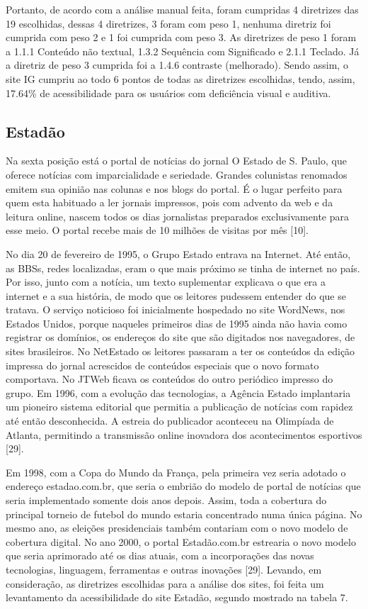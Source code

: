 \documentclass[a4paper]{article}
\begin{document}
\begin{titlepage}
Portanto, de acordo com a análise manual feita, foram cumpridas 4 diretrizes das 19 escolhidas, dessas 4 diretrizes, 3 foram com peso 1, nenhuma diretriz foi cumprida com peso 2 e 1 foi cumprida com peso 3. As diretrizes de peso 1 foram a 1.1.1 Conteúdo não textual, 1.3.2 Sequência com Significado e 2.1.1 Teclado. Já a diretriz de peso 3 cumprida foi a 1.4.6 contraste (melhorado). Sendo assim, o site IG cumpriu ao todo 6 pontos de todas as diretrizes escolhidas, tendo, assim, 17.64\% de acessibilidade para os usuários com deficiência visual e auditiva.

\subsection{Estadão}

Na sexta posição está o portal de notícias do jornal O Estado de S. Paulo, que oferece notícias com imparcialidade e seriedade. Grandes colunistas renomados emitem sua opinião nas colunas e nos blogs do portal. É o lugar perfeito para quem esta habituado a ler jornais impressos, pois com advento da web e da leitura online, nascem todos os dias jornalistas preparados exclusivamente para esse meio. O portal recebe mais de 10 milhões de visitas por mês [10].

No dia 20 de fevereiro de 1995, o Grupo Estado entrava na Internet. Até então, as BBSs, redes localizadas, eram o que mais próximo se tinha de internet no país. Por isso, junto com a notícia, um texto suplementar explicava o que era a internet e a sua história, de modo que os leitores pudessem entender do que se tratava. O serviço noticioso foi inicialmente hospedado no site WordNews, nos Estados Unidos, porque naqueles primeiros dias de 1995 ainda não havia como registrar os domínios, os endereços do site que são digitados nos navegadores, de sites brasileiros. No NetEstado os leitores passaram a ter os conteúdos da edição impressa do jornal acrescidos de conteúdos especiais que o novo formato comportava. No JTWeb ficava os conteúdos do outro periódico impresso do grupo. Em 1996, com a evolução das tecnologias, a Agência Estado implantaria um pioneiro sistema editorial que permitia a publicação de notícias com rapidez até então desconhecida. A estreia do publicador aconteceu na Olimpíada de Atlanta, permitindo a transmissão online inovadora dos acontecimentos esportivos [29].

Em 1998, com a Copa do Mundo da França, pela primeira vez seria adotado o endereço estadao.com.br, que seria o embrião do modelo de portal de notícias que seria implementado somente dois anos depois. Assim, toda a cobertura do principal torneio de futebol do mundo estaria concentrado numa única página. No mesmo ano, as eleições presidenciais também contariam com o novo modelo de cobertura digital. No ano 2000, o portal Estadão.com.br estrearia o novo modelo que seria aprimorado até os dias atuais, com a incorporações das novas tecnologias, linguagem, ferramentas e outras inovações [29].  Levando, em consideração, as diretrizes escolhidas para a análise dos sites, foi feita um levantamento da acessibilidade do site Estadão, segundo mostrado na tabela 7.\\


\end{titlepage}
\end{document}
